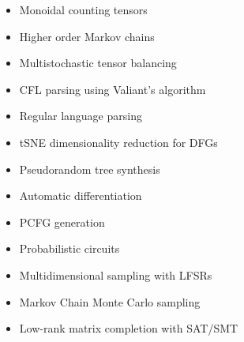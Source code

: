 \documentclass[sigplan,10pt,review,anonymous]{acmart}
\begin{document}
\begin{itemize}
  \item Monoidal counting tensors
  \item Higher order Markov chains
  \item Multistochastic tensor balancing
  \item CFL parsing using Valiant's algorithm
  \item Regular language parsing
  \item tSNE dimensionality reduction for DFGs
  \item Pseudorandom tree synthesis
  \item Automatic differentiation
  \item PCFG generation
  \item Probabilistic circuits
  \item Multidimensional sampling with LFSRs
  \item Markov Chain Monte Carlo sampling
  \item Low-rank matrix completion with SAT/SMT
\end{itemize}





\end{document}

